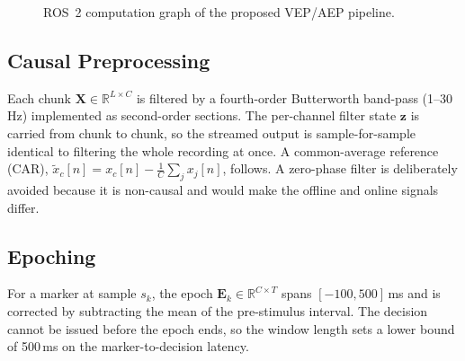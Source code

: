 \documentclass[conference]{IEEEtran}
\begin{document}
\begin{figure}[t]
\centering
{}
\caption{ROS~2 computation graph of the proposed VEP/AEP pipeline.}
\label{fig:arch}
\end{figure}

\subsection{Causal Preprocessing}\label{sec:pre}
Each chunk $\mathbf{X}\in\mathbb{R}^{L\times C}$ is filtered by a fourth-order Butterworth band-pass (1--30\,Hz) implemented as second-order sections. The per-channel filter state $\mathbf{z}$ is carried from chunk to chunk, so the streamed output is sample-for-sample identical to filtering the whole recording at once. A common-average reference (CAR), $\tilde{x}_c[n]=x_c[n]-\frac{1}{C}\sum_{j}x_j[n]$, follows. A zero-phase filter is deliberately avoided because it is non-causal and would make the offline and online signals differ.

\subsection{Epoching}
For a marker at sample $s_k$, the epoch $\mathbf{E}_k\in\mathbb{R}^{C\times T}$ spans $[-100, 500]$\,ms and is corrected by subtracting the mean of the pre-stimulus interval. The decision cannot be issued before the epoch ends, so the window length sets a lower bound of 500\,ms on the marker-to-decision latency.
\end{document}
